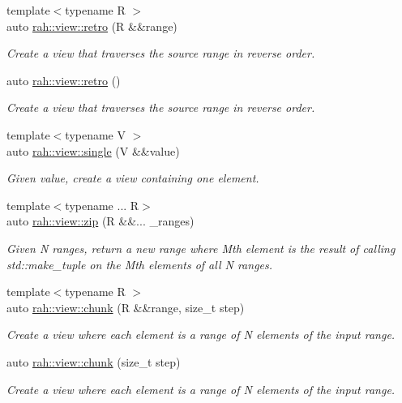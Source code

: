 \begin{DoxyCompactItemize}
{\footnotesize template$<$typename R $>$ }\\auto \mbox{\hyperlink{namespacerah_1_1view_ab7e756d22f9204231b4854b9deb51f6f}{rah\+::view\+::retro}} (R \&\&range)
\begin{DoxyCompactList}\small\item\em Create a view that traverses the source range in reverse order. \end{DoxyCompactList}\item 
auto \mbox{\hyperlink{namespacerah_1_1view_a6c6543c61f1fb119394952a72c564753}{rah\+::view\+::retro}} ()
\begin{DoxyCompactList}\small\item\em Create a view that traverses the source range in reverse order. \end{DoxyCompactList}\item 
{\footnotesize template$<$typename V $>$ }\\auto \mbox{\hyperlink{namespacerah_1_1view_ad37c24275c6eb4642a20466545a9baa3}{rah\+::view\+::single}} (V \&\&value)
\begin{DoxyCompactList}\small\item\em Given value, create a view containing one element. \end{DoxyCompactList}\item 
{\footnotesize template$<$typename ... R$>$ }\\auto \mbox{\hyperlink{namespacerah_1_1view_a26c5da9052b94179d6ad8614ea2b9fda}{rah\+::view\+::zip}} (R \&\&... \+\_\+ranges)
\begin{DoxyCompactList}\small\item\em Given N ranges, return a new range where Mth element is the result of calling std\+::make\+\_\+tuple on the Mth elements of all N ranges. \end{DoxyCompactList}\item 
{\footnotesize template$<$typename R $>$ }\\auto \mbox{\hyperlink{namespacerah_1_1view_aa4ea72dd93cb1d17db2f4755bdee0cef}{rah\+::view\+::chunk}} (R \&\&range, size\+\_\+t step)
\begin{DoxyCompactList}\small\item\em Create a view where each element is a range of N elements of the input range. \end{DoxyCompactList}\item 
auto \mbox{\hyperlink{namespacerah_1_1view_ab29a0945581f92240cbcc9f81811c08b}{rah\+::view\+::chunk}} (size\+\_\+t step)
\begin{DoxyCompactList}\small\item\em Create a view where each element is a range of N elements of the input range. \end{DoxyCompactList}\item 

\end{DoxyCompactItemize}
